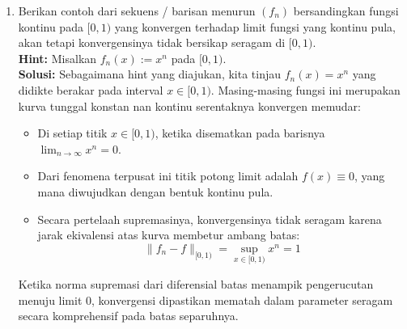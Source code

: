 ﻿\documentclass{article}
\begin{document}
\begin{enumerate}
        \vspace{0.5cm}
  \item[20.] Berikan contoh dari sekuens / barisan menurun $(f_n)$ bersandingkan fungsi kontinu pada $[0, 1)$ yang konvergen terhadap limit fungsi yang kontinu pula, akan tetapi konvergensinya tidak bersikap seragam di $[0, 1)$.\\
        \textbf{Hint:} Misalkan $f_n(x) := x^n$ pada $[0, 1)$.\\
        \textbf{Solusi:}
        Sebagaimana hint yang diajukan, kita tinjau $f_n(x) = x^n$ yang didikte berakar pada interval $x \in [0, 1)$.
        Masing-masing fungsi ini merupakan kurva tunggal konstan nan kontinu serentaknya konvergen memudar:
        \begin{itemize}
          \item Di setiap titik $x \in [0, 1)$, ketika disematkan pada barisnya $\lim_{n \to \infty} x^n = 0$.
          \item Dari fenomena terpusat ini titik potong limit adalah $f(x) \equiv 0$, yang mana diwujudkan dengan bentuk kontinu pula.
          \item Secara pertelaah supremasinya, konvergensinya tidak seragam karena jarak ekivalensi atas kurva membetur ambang batas:
                \[ \|f_n - f\|_{[0, 1)} = \sup_{x \in [0, 1)} x^n = 1 \]
        \end{itemize}
        Ketika norma supremasi dari diferensial batas menampik pengerucutan menuju limit $0$, konvergensi dipastikan mematah dalam parameter seragam secara komprehensif pada batas separuhnya.

\end{enumerate}
\end{document}
